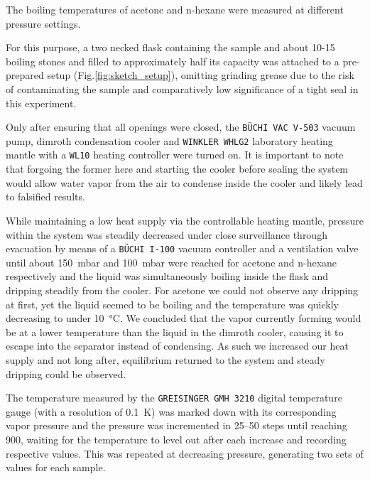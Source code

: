 {The boiling temperatures of acetone and n-hexane were measured at different pressure settings. 

For this purpose, a two necked flask containing the sample and about 10-15 boiling stones and filled to approximately half its capacity was attached to a pre-prepared setup (Fig.\ref{fig:sketch_setup}), omitting grinding grease due to the risk of contaminating the sample and comparatively low significance of a tight seal in this experiment.

Only after ensuring that all openings were closed, the \texttt{BÜCHI VAC V-503} vacuum pump, dimroth condensation cooler and \texttt{WINKLER WHLG2} laboratory heating mantle with a \texttt{WL10} heating controller were turned on. It is important to note that forgoing the former here and starting the cooler before sealing the system would allow water vapor from the air to condense inside the cooler and likely lead to falsified results. 

While maintaining a low heat supply via the controllable heating mantle, pressure within the system was steadily decreased under close surveillance through evacuation by means of a \texttt{BÜCHI I-100} vacuum controller and a ventilation valve until about \qty{150}{\milli\bar} and \qty{100}{\milli\bar} were reached for acetone and n-hexane respectively and the liquid was simultaneously boiling inside the flask and dripping steadily from the cooler. For acetone we could not observe any dripping at first, yet the liquid seemed to be boiling and the temperature was quickly decreasing to under \qty{10}{\celsius}. We concluded that the vapor currently forming would be at a lower temperature than the liquid in the dimroth cooler, causing it to escape into the separator instead of condensing. As such we increased our heat supply and not long after, equilibrium returned to the system and steady dripping could be observed. 

The temperature measured by the \texttt{GREISINGER GMH 3210} digital temperature gauge (with a resolution of \qty{0.1}{\kelvin}) was marked down with its corresponding vapor pressure and the pressure was incremented in \qtyrange{25}{50}{\mbar} steps until reaching \qty{900}{\mbar}, waiting for the temperature to level out after each increase and recording respective values. This was repeated at decreasing pressure, generating two sets of values for each sample.







}
